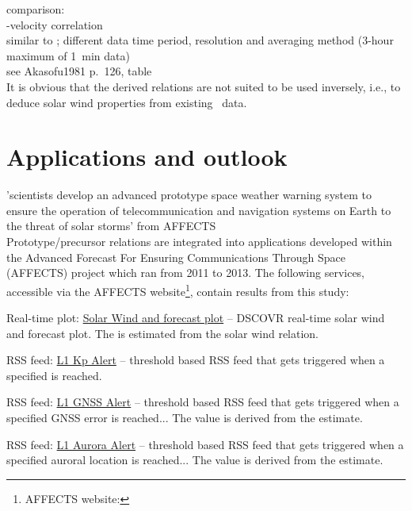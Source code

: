 {comparison:\\
\Kp-velocity correlation\\
similar to \citet{Elliott2013}; different data time period, resolution and averaging method (3-hour maximum of 1~min data)\\
see Akasofu1981 p.~126, table\\


It is obvious that the derived relations are not suited to be used inversely, i.e., to deduce solar wind properties from existing \Kp{}~data.\\


\section{Applications and outlook}

'scientists develop an advanced prototype space weather warning system to ensure the operation of telecommunication and navigation systems on Earth to the threat of solar storms' from AFFECTS\\

Prototype/precursor relations are integrated into applications developed within the Advanced Forecast For Ensuring Communications Through Space (\mbox{AFFECTS}) project which ran from 2011 to 2013. The following services, accessible via the \mbox{AFFECTS} website\footnote{AFFECTS website: }, contain results from this \Kp{} study:
\begin{itemize*}
	\item Real-time plot: \href{http://www.affects-fp7.eu/rssfeeds/ace_ap_forecast_plot/ace_realtime_ap_CH_GFT_plot.png}{Solar Wind and \Kp{} forecast plot} -- DSCOVR real-time solar wind and \Kp{} forecast plot. The \Kp{} is estimated from the solar wind relation.
	\item RSS feed: \href{http://www.affects-fp7.eu/rssfeeds/rssfeed_kp/rssfeed_kp.xml}{L1 Kp Alert} -- threshold based RSS feed that gets triggered when a specified \Kp{} is reached.
	\item RSS feed: \href{http://www.affects-fp7.eu/rssfeeds/rssfeed_gnss/rssfeed_gnss.xml}{L1 GNSS Alert} -- threshold based RSS feed that gets triggered when a specified GNSS error is reached... The value is derived from the \Kp{} estimate.
	\item RSS feed: \href{http://www.affects-fp7.eu/rssfeeds/rssfeed_aurora/rssfeed_aurora.xml}{L1 Aurora Alert} -- threshold based RSS feed that gets triggered when a specified auroral location is reached... The value is derived from the \Kp{} estimate.
\end{itemize*}

}
